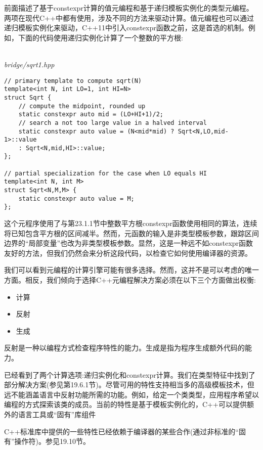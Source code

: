 前面描述了基于constexpr计算的值元编程和基于递归模板实例化的类型元编程。两项在现代C++中都有使用，涉及不同的方法来驱动计算。值元编程也可以通过递归模板实例化来驱动，C++11中引入constexpr函数之前，这是首选的机制。例如，下面的代码使用递归实例化计算了一个整数的平方根:

\hspace*{\fill} \\ %
\noindent
\textit{bridge/sqrt1.hpp}
\begin{lstlisting}[style=styleCXX]
// primary template to compute sqrt(N)
template<int N, int LO=1, int HI=N>
struct Sqrt {
	// compute the midpoint, rounded up
	static constexpr auto mid = (LO+HI+1)/2;
	// search a not too large value in a halved interval
	static constexpr auto value = (N<mid*mid) ? Sqrt<N,LO,mid-1>::value
	: Sqrt<N,mid,HI>::value;
};

// partial specialization for the case when LO equals HI
template<int N, int M>
struct Sqrt<N,M,M> {
	static constexpr auto value = M;
};
\end{lstlisting}

这个元程序使用了与第23.1.1节中整数平方根constexpr函数使用相同的算法，连续将已知包含平方根的区间减半。然而，元函数的输入是非类型模板参数，跟踪区间边界的“局部变量”也改为非类型模板参数。显然，这是一种远不如constexpr函数友好的方法，但我们仍然会来分析这段代码，以检查它如何使用编译器的资源。

我们可以看到元编程的计算引擎可能有很多选择。然而，这并不是可以考虑的唯一方面。相反，我们倾向于选择C++元编程解决方案必须在以下三个方面做出权衡:

\begin{itemize}
\item 
计算

\item 
反射

\item 
生成
\end{itemize}

反射是一种以编程方式检查程序特性的能力。生成是指为程序生成额外代码的能力。

已经看到了两个计算选项:递归实例化和constexpr计算。我们在类型特征中找到了部分解决方案(参见第19.6.1节)。尽管可用的特性支持相当多的高级模板技术，但远不能涵盖语言中反射功能所需的功能。例如，给定一个类类型，应用程序希望以编程的方式探索该类的成员。当前的特性是基于模板实例化的，C++可以提供额外的语言工具或“固有”库组件

\begin{tcolorbox}[colback=webgreen!5!white,colframe=webgreen!75!black]
\hspace*{0.75cm}C++标准库中提供的一些特性已经依赖于编译器的某些合作(通过非标准的“固有”操作符)。参见19.10节。
\end{tcolorbox}

